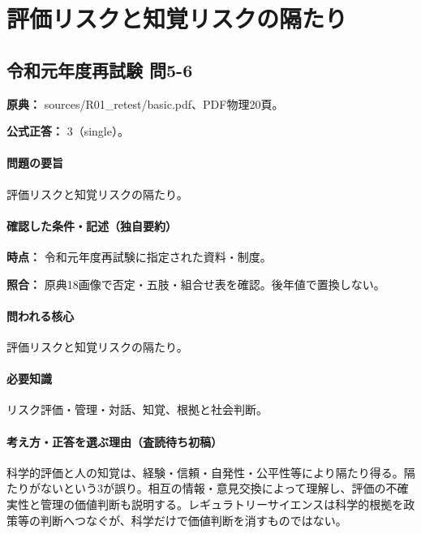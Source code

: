 \section{評価リスクと知覚リスクの隔たり}

\subsection{令和元年度再試験 問5-6}
\label{q:r01-ret-basic-5-6}

\noindent\textbf{原典：} sources/R01\_retest/basic.pdf、PDF物理20頁。

\textbf{公式正答：} 3（single）。

\paragraph{問題の要旨} 評価リスクと知覚リスクの隔たり。

\paragraph{確認した条件・記述（独自要約）}\mbox{}\par

\noindent\textbf{時点：} 令和元年度再試験に指定された資料・制度。\par

\noindent\textbf{照合：} 原典18画像で否定・五肢・組合せ表を確認。後年値で置換しない。\par

\paragraph{問われる核心} 評価リスクと知覚リスクの隔たり。

\paragraph{必要知識} リスク評価・管理・対話、知覚、根拠と社会判断。

\paragraph{考え方・正答を選ぶ理由（査読待ち初稿）} 科学的評価と人の知覚は、経験・信頼・自発性・公平性等により隔たり得る。隔たりがないという3が誤り。相互の情報・意見交換によって理解し、評価の不確実性と管理の価値判断も説明する。レギュラトリーサイエンスは科学的根拠を政策等の判断へつなぐが、科学だけで価値判断を消すものではない。

